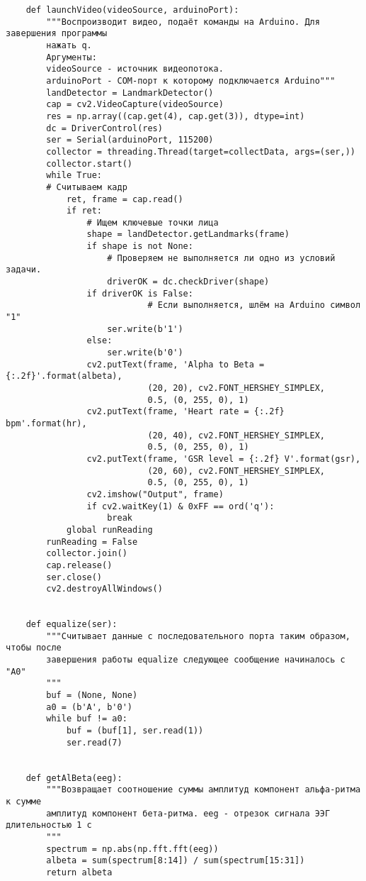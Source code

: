 \begin{verbatim}
    def launchVideo(videoSource, arduinoPort):
        """Воспроизводит видео, подаёт команды на Arduino. Для завершения программы
        нажать q.
        Аргументы:
        videoSource - источник видеопотока.
        arduinoPort - COM-порт к которому подключается Arduino"""
        landDetector = LandmarkDetector()
        cap = cv2.VideoCapture(videoSource)
        res = np.array((cap.get(4), cap.get(3)), dtype=int)
        dc = DriverControl(res)
        ser = Serial(arduinoPort, 115200)
        collector = threading.Thread(target=collectData, args=(ser,))
        collector.start()
        while True:
        # Считываем кадр
            ret, frame = cap.read()
            if ret:
                # Ищем ключевые точки лица
                shape = landDetector.getLandmarks(frame)
                if shape is not None:
                    # Проверяем не выполняется ли одно из условий задачи.
                    driverOK = dc.checkDriver(shape)
                if driverOK is False:
                            # Если выполняется, шлём на Arduino символ "1"
                    ser.write(b'1')
                else:
                    ser.write(b'0')
                cv2.putText(frame, 'Alpha to Beta = {:.2f}'.format(albeta),
                            (20, 20), cv2.FONT_HERSHEY_SIMPLEX,
                            0.5, (0, 255, 0), 1)
                cv2.putText(frame, 'Heart rate = {:.2f} bpm'.format(hr),
                            (20, 40), cv2.FONT_HERSHEY_SIMPLEX,
                            0.5, (0, 255, 0), 1)
                cv2.putText(frame, 'GSR level = {:.2f} V'.format(gsr),
                            (20, 60), cv2.FONT_HERSHEY_SIMPLEX,
                            0.5, (0, 255, 0), 1)
                cv2.imshow("Output", frame)
                if cv2.waitKey(1) & 0xFF == ord('q'):
                    break
            global runReading
        runReading = False
        collector.join()
        cap.release()
        ser.close()
        cv2.destroyAllWindows()


    def equalize(ser):
        """Считывает данные с последовательного порта таким образом, чтобы после
        завершения работы equalize следующее сообщение начиналось с "A0"
        """
        buf = (None, None)
        a0 = (b'A', b'0')
        while buf != a0:
            buf = (buf[1], ser.read(1))
            ser.read(7)


    def getAlBeta(eeg):
        """Возвращает соотношение суммы амплитуд компонент альфа-ритма к сумме
        амплитуд компонент бета-ритма. eeg - отрезок сигнала ЭЭГ длительностью 1 с
        """
        spectrum = np.abs(np.fft.fft(eeg))
        albeta = sum(spectrum[8:14]) / sum(spectrum[15:31])
        return albeta



\end{verbatim}
